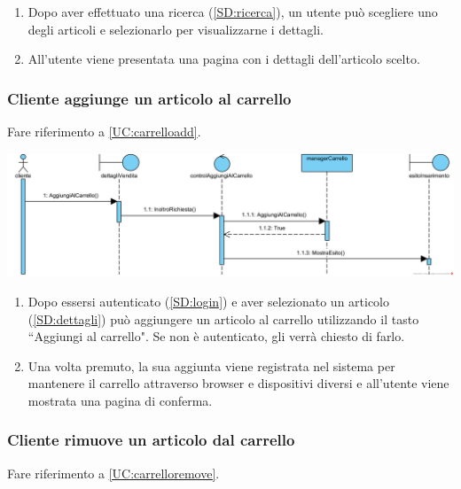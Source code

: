 \documentclass[12pt,a4paper]{article}
\begin{document}
\begin{enumerate}
\item Dopo aver effettuato una ricerca (\ref{SD:ricerca}), un utente può scegliere uno degli articoli e selezionarlo per visualizzarne i dettagli.
\item All'utente viene presentata una pagina con i dettagli dell'articolo scelto.
\end{enumerate}

\newpage

\subsubsection{Cliente aggiunge un articolo al carrello}
\label{SD:aggiunta}

Fare riferimento a \ref{UC:carrelloadd}. \\

\begin{center}
\includegraphics[width=\textwidth]{SequenceDiagram/ClienteCarrelloAggiunge}
\end{center}

\begin{enumerate}
\item Dopo essersi autenticato (\ref{SD:login}) e aver selezionato un articolo (\ref{SD:dettagli}) può aggiungere un articolo al carrello utilizzando il tasto ``Aggiungi al carrello". Se non è autenticato, gli verrà chiesto di farlo.

\item Una volta premuto, la sua aggiunta viene registrata nel sistema per mantenere il carrello attraverso browser e dispositivi diversi e all'utente viene mostrata una pagina di conferma.
\end{enumerate}

\subsubsection{Cliente rimuove un articolo dal carrello}
\label{SD:rimozione}

Fare riferimento a \ref{UC:carrelloremove}. \\
\end{document}
